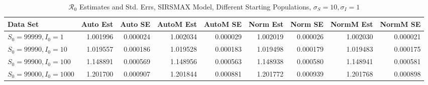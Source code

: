 \documentclass[12pt]{article}
\newcommand{\rr}{\ensuremath{\mathcal{R}_0}}
\begin{document}
\begin{table}[H]
	
	\caption{$\rr$ Estimates and Std. Errs, SIRSMAX Model,
		Different Starting Populations, 
		$\sigma_S = 10, \sigma_I = 1$}
	\begin{footnotesize}
		\hskip -1.7cm
	\begin{tabular}{l|r|r|r|r|r|r|r|r}
		\hline
		Data Set & Auto Est & Auto SE & AutoM Est & AutoM SE & Norm Est & Norm SE & NormM Est & NormM SE\\
		\hline
		$S_0 = 99999, I_0 = 1$ & 1.001996 & 0.000024 & 1.002034 & 0.000029 & 1.002019 & 0.000026 & 1.002030 & 0.000021\\
		\hline
		$S_0 = 99990, I_0 = 10$ & 1.019557 & 0.000186 & 1.019528 & 0.000183 & 1.019498 & 0.000179 & 1.019483 & 0.000175\\
		\hline
		$S_0 = 99900, I_0 = 100$ & 1.148891 & 0.000569 & 1.148956 & 0.000563 & 1.148938 & 0.000580 & 1.148941 & 0.000581\\
		\hline
		$S_0 = 99000, I_0 = 1000$ & 1.201700 & 0.000907 & 1.201844 & 0.000881 & 1.201772 & 0.000939 & 1.201768 & 0.000898\\
		\hline
	\end{tabular}
\end{footnotesize}
\end{table}
\end{document}
